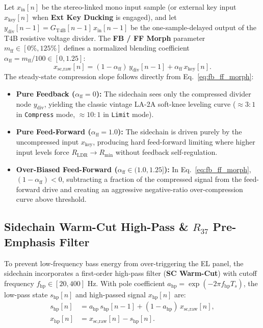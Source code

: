 \documentclass[11pt,a4paper]{article}
\begin{document}
Let $x_{\text{in}}[n]$ be the stereo-linked mono input sample (or external key input $x_{\text{key}}[n]$ when \textbf{Ext Key Ducking} is engaged), and let $y_{\text{div}}[n-1] = G_{\text{T4B}}[n-1]\,x_{\text{in}}[n-1]$ be the one-sample-delayed output of the T4B resistive voltage divider. The \textbf{FB / FF Morph} parameter $m_{\text{ff}} \in [0\%, 125\%]$ defines a normalized blending coefficient $\alpha_{\text{ff}} = m_{\text{ff}} / 100 \in [0, 1.25]$:
\begin{equation}
    x_{\text{sc,raw}}[n] = (1 - \alpha_{\text{ff}})\,y_{\text{div}}[n-1] + \alpha_{\text{ff}}\,x_{\text{key}}[n].
    \label{eq:fb_ff_morph}
\end{equation}
The steady-state compression slope follows directly from Eq.~\eqref{eq:fb_ff_morph}:
\begin{itemize}
    \item \textbf{Pure Feedback ($\alpha_{\text{ff}} = 0$):} The sidechain sees only the compressed divider node $y_{\text{div}}$, yielding the classic vintage LA-2A soft-knee leveling curve ($\approx 3\!:\!1$ in \texttt{Compress} mode, $\approx 10\!:\!1$ in \texttt{Limit} mode).
    \item \textbf{Pure Feed-Forward ($\alpha_{\text{ff}} = 1.0$):} The sidechain is driven purely by the uncompressed input $x_{\text{key}}$, producing hard feed-forward limiting where higher input levels force $R_{\text{LDR}} \to R_{\text{min}}$ without feedback self-regulation.
    \item \textbf{Over-Biased Feed-Forward ($\alpha_{\text{ff}} \in (1.0, 1.25]$):} In Eq.~\eqref{eq:fb_ff_morph}, $(1-\alpha_{\text{ff}}) < 0$, subtracting a fraction of the compressed signal from the feed-forward drive and creating an aggressive negative-ratio over-compression curve above threshold.
\end{itemize}

\subsection{Sidechain Warm-Cut High-Pass \& \texorpdfstring{$R_{37}$}{R37} Pre-Emphasis Filter}

To prevent low-frequency bass energy from over-triggering the EL panel, the sidechain incorporates a first-order high-pass filter (\textbf{SC Warm-Cut}) with cutoff frequency $f_{\text{hp}} \in [20, 400]\text{ Hz}$. With pole coefficient $a_{\text{hp}} = \exp(-2\pi f_{\text{hp}} T_s)$, the low-pass state $s_{\text{hp}}[n]$ and high-passed signal $x_{\text{hp}}[n]$ are:
\begin{align}
    s_{\text{hp}}[n] &= a_{\text{hp}}\,s_{\text{hp}}[n-1] + (1 - a_{\text{hp}})\,x_{\text{sc,raw}}[n], \\
    x_{\text{hp}}[n] &= x_{\text{sc,raw}}[n] - s_{\text{hp}}[n].
\end{align}
\end{document}
